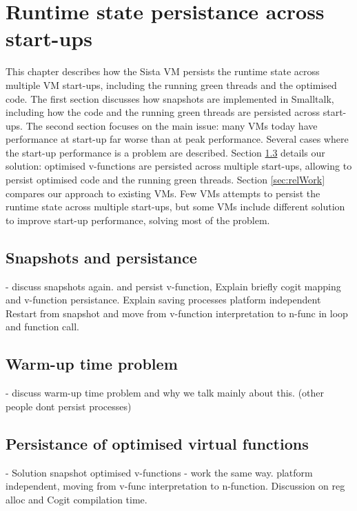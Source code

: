 \documentclass[a4paper,12pt,twoside]{../includes/ThesisStyle}
\begin{document}
\fi

\chapter{Runtime state persistance across start-ups}
\label{chap:persistance}
\minitoc

This chapter describes how the Sista VM persists the runtime state across multiple VM start-ups, including the running green threads and the optimised code. The first section discusses how snapshots are implemented in Smalltalk, including how the code and the running green threads are persisted across start-ups. The second section focuses on the main issue: many VMs today have performance at start-up far worse than at peak performance. Several cases where the start-up performance is a problem are described. Section \ref{sec:persistanceSol} details our solution: optimised v-functions are persisted across multiple start-ups, allowing to persist optimised code and the running green threads. Section \ref{sec:relWork} compares our approach to existing VMs. Few VMs attempts to persist the runtime state across multiple start-ups, but some VMs include different solution to improve start-up performance, solving most of the problem.

\section{Snapshots and persistance}

- discuss snapshots again. 
and persist v-function, 
Explain briefly cogit mapping and v-function persistance.
Explain saving processes
platform independent
Restart from snapshot and move from v-function interpretation to n-func in loop and function call.

\section{Warm-up time problem}

- discuss warm-up time problem and why we talk mainly about this. (other people dont persist processes)

\section{Persistance of optimised virtual functions}
\label{sec:persistanceSol}

- Solution snapshot optimised v-functions - work the same way.
platform independent, moving from v-func interpretation to n-function.
Discussion on reg alloc and Cogit compilation time.
\end{document}
